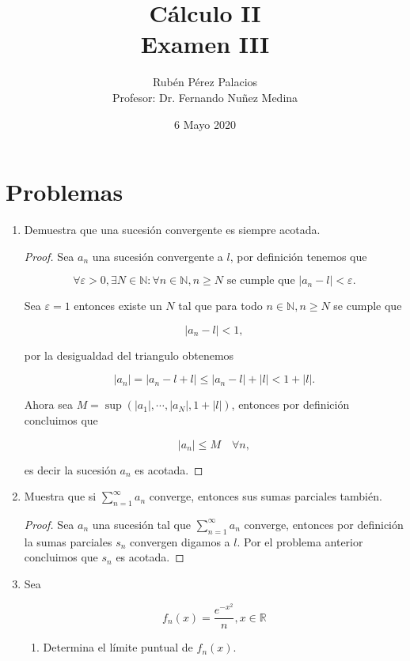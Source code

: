 \documentclass[letterpaper]{article}
\title{Cálculo II\\Examen III}
\author{Rubén Pérez Palacios\\Profesor: Dr. Fernando Nuñez Medina}
\date{6 Mayo 2020}
\theoremstyle{definition}
\theoremstyle{lemathm}
\theoremstyle{lemademthm}
\newcommand{\N}{\mathbb{N}}
\newcommand{\R}{\mathbb{R}}
\begin{document}
	\maketitle

    \section*{Problemas}

	\begin{enumerate}
		
		\item Demuestra que una sucesión convergente es siempre acotada.
		\begin{proof}
		
			Sea $a_n$ una sucesión convergente a $l$, por definición tenemos que

			\[\forall \varepsilon > 0, \exists N \in \N : \forall n \in \N, n \geq N \text{ se cumple que } |a_n - l| < \varepsilon.\]

			Sea $\varepsilon = 1$ entonces existe un $N$ tal que para todo $n \in \N, n \geq N$ se cumple que

			\[|a_n - l| < 1,\]

			por la desigualdad del triangulo obtenemos

			\[|a_n| = |a_n - l + l| \leq |a_n - l| + |l| < 1 + |l|.\]

			Ahora sea $M = \sup(|a_1|, \cdots, |a_N|, 1+|l|)$, entonces por definición concluimos que

			\[|a_n| \leq M \quad \forall n,\]

			es decir la sucesión $a_n$ es acotada.

		\end{proof}

		\item Muestra que si $\sum_{n=1}^{\infty} a_n$ converge, entonces sus sumas parciales también.
		
		\begin{proof}
			Sea $a_n$ una sucesión tal que $\sum_{n=1}^{\infty} a_n$ converge, entonces por definición la sumas parciales $s_n$ convergen digamos a $l$. Por el problema anterior concluimos que $s_n$ es acotada.
		\end{proof}

		\newpage

		\item Sea
		
		\[f_n(x) = \frac{e^{-x^2}}{n}, x\in\R\]

		\begin{enumerate}
			\item Determina el límite puntual de $f_n(x)$.
			

\end{enumerate}
\end{enumerate}
\end{document}
